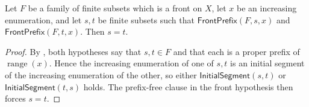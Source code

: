 \begin{lemma}
Let $F$ be a family of finite subsets which is a front on $X$, let $x$ be
an increasing enumeration, and let $s,t$ be finite subsets such that
$\mathsf{FrontPrefix}(F,s,x)$ and
$\mathsf{FrontPrefix}(F,t,x)$.
Then $s=t$.
\end{lemma}
\begin{proof}
By , both hypotheses say that $s,t\in F$ and that
each is a proper prefix of $\operatorname{range}(x)$.  Hence the increasing
enumeration of one of $s,t$ is an initial segment of the increasing
enumeration of the other, so either
$\mathsf{InitialSegment}(s,t)$ or
$\mathsf{InitialSegment}(t,s)$ holds.  The prefix-free clause in the front
hypothesis  then forces $s=t$.
\end{proof}
